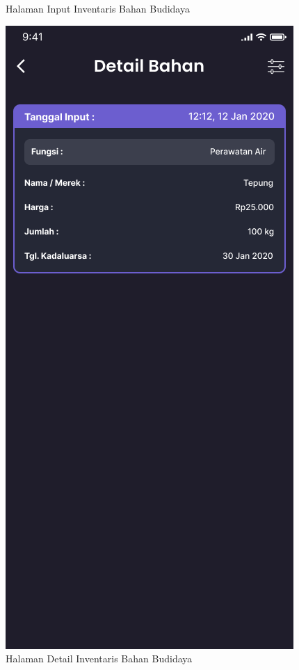 \begin{enumerate}
\begin{enumerate}
\begin{figure}[H]
			  \caption{Halaman Input Inventaris Bahan Budidaya}
			\endminipage\hfill
			  \includegraphics[width=\linewidth]{gambar/sprint1/mockup_list_materials.png}
			  \caption{Halaman Detail Inventaris Bahan Budidaya}
			\endminipage
		\end{figure}


\end{enumerate}
\end{enumerate}

